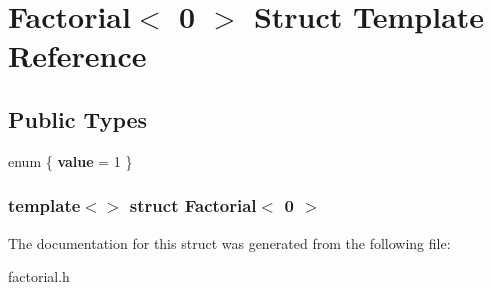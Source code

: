 \hypertarget{structFactorial_3_010_01_4}{\section{\-Factorial$<$ 0 $>$ \-Struct \-Template \-Reference}
\label{structFactorial_3_010_01_4}
}
\subsection*{\-Public \-Types}
\begin{DoxyCompactItemize}
\item 
enum \{ {\bfseries value} =  1
 \}
\end{DoxyCompactItemize}
\subsubsection*{template$<$$>$ struct Factorial$<$ 0 $>$}



\-The documentation for this struct was generated from the following file\-:\begin{DoxyCompactItemize}
\item 
factorial.\-h\end{DoxyCompactItemize}
